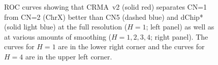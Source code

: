 \documentclass{bioinfo}
\begin{document}
\begin{figure}[!tpbh]
\begin{center}
\end{center}
 \caption{
   ROC curves showing that CRMA~v2 (solid red) separates CN=1 from CN=2 (ChrX) better than CN5 (dashed blue) and dChip* (solid light blue) at the full resolution ($H=1$; left panel) as well as at various amounts of smoothing ($H=1,2,3,4$; right panel).  The curves for $H=1$ are in the lower right corner and the curves for $H=4$ are in the upper left corner.
 }
 \label{figRocChrX}
\end{figure}
\end{document}
